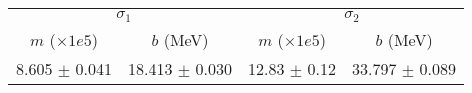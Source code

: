 \begin{tabular}{cc|cc}
\multicolumn{2}{c|}{$\sigma_1$} & \multicolumn{2}{|c}{$\sigma_2$} \\
$m$ ($\times1e5$) & $b$ (MeV) & $m$ ($\times1e5$) & $b$ (MeV) \\
\hline
8.605 $\pm$ 0.041 & 18.413 $\pm$ 0.030 & 12.83 $\pm$ 0.12 & 33.797 $\pm$ 0.089\\
\end{tabular}
